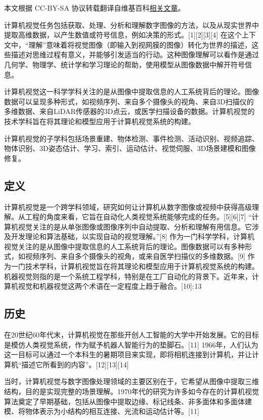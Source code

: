 
本文根据 CC-BY-SA 协议转载翻译自维基百科\href{https://en.wikipedia.org/wiki/Maxwell\%27s_equations}{相关文章}。

计算机视觉任务包括获取、处理、分析和理解数字图像的方法，以及从现实世界中提取高维数据，以产生数值或符号信息，例如决策的形式。[1][2][3][4] 在这个上下文中，“理解”意味着将视觉图像（即输入到视网膜的图像）转化为世界的描述，这些描述对思维过程有意义，并能够引发适当的行动。这种图像理解可以看作是通过几何学、物理学、统计学和学习理论的帮助，使用模型从图像数据中解开符号信息。

计算机视觉这一科学学科关注的是从图像中提取信息的人工系统背后的理论。图像数据可以呈现多种形式，如视频序列、来自多个摄像头的视角、来自3D扫描仪的多维数据、来自LiDAR传感器的3D点云，或医学扫描设备的数据。计算机视觉的技术学科旨在将其理论和模型应用于计算机视觉系统的构建。

计算机视觉的子学科包括场景重建、物体检测、事件检测、活动识别、视频追踪、物体识别、3D姿态估计、学习、索引、运动估计、视觉伺服、3D场景建模和图像修复。
\subsection{定义}  
计算机视觉是一个跨学科领域，研究如何让计算机从数字图像或视频中获得高级理解。从工程的角度来看，它旨在自动化人类视觉系统能够完成的任务。[5][6][7] “计算机视觉关注的是从单张图像或图像序列中自动提取、分析和理解有用信息。它涉及开发理论和算法基础，以实现自动的视觉理解。”[8] 作为一门科学学科，计算机视觉关注的是从图像中提取信息的人工系统背后的理论。图像数据可以有多种形式，如视频序列、来自多个摄像头的视角，或来自医学扫描仪的多维数据。[9] 作为一门技术学科，计算机视觉旨在将其理论和模型应用于计算机视觉系统的构建。机器视觉则指的是一个系统工程学科，特别是在工厂自动化的背景下。近年来，计算机视觉和机器视觉这两个术语在一定程度上趋于融合。[10]: 13 
\subsection{历史}  
在20世纪60年代末，计算机视觉在那些开创人工智能的大学中开始发展。它的目标是模仿人类视觉系统，作为赋予机器人智能行为的垫脚石。[11] 1966年，人们认为这一目标可以通过一个本科生的暑期项目来实现，即将相机连接到计算机，并让计算机“描述它所看到的内容”。[12][13][14]

当时，计算机视觉与数字图像处理领域的主要区别在于，它希望从图像中提取三维结构，目的是实现完整的场景理解。1970年代的研究为许多如今存在的计算机视觉算法奠定了早期基础，包括从图像中提取边缘、标记线条、非多面体和多面体建模、将物体表示为小结构的相互连接、光流和运动估计等。[11]

